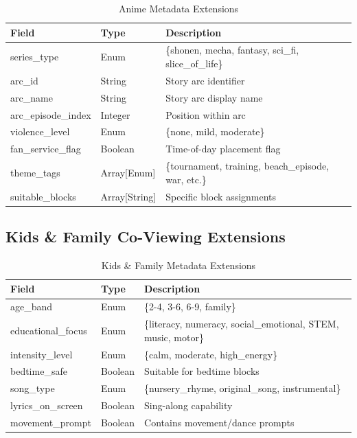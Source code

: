 \documentclass[12pt,letterpaper,twoside]{report}
\begin{document}
\begin{table}[H]
\centering
\caption{Anime Metadata Extensions}
\begin{tabular}{@{}L{4cm}L{3cm}L{6.5cm}@{}}
\toprule
\textbf{Field} & \textbf{Type} & \textbf{Description} \\
\midrule
series\_\allowbreak type & Enum & \{shonen, mecha, fantasy, sci\_\allowbreak fi, slice\_\allowbreak of\_\allowbreak life\} \\
arc\_\allowbreak id & String & Story arc identifier \\
arc\_\allowbreak name & String & Story arc display name \\
arc\_\allowbreak episode\_\allowbreak index & Integer & Position within arc \\
violence\_\allowbreak level & Enum & \{none, mild, moderate\} \\
fan\_\allowbreak service\_\allowbreak flag & Boolean & Time-of-day placement flag \\
theme\_\allowbreak tags & Array[Enum] & \{tournament, training, beach\_\allowbreak episode, war, etc.\} \\
suitable\_\allowbreak blocks & Array[String] & Specific block assignments \\
\bottomrule
\end{tabular}
\end{table}

\subsection{Kids \& Family Co-Viewing Extensions}

\begin{table}[H]
\centering
\caption{Kids \& Family Metadata Extensions}
\begin{tabular}{@{}L{4cm}L{3cm}L{6.5cm}@{}}
\toprule
\textbf{Field} & \textbf{Type} & \textbf{Description} \\
\midrule
age\_\allowbreak band & Enum & \{2-4, 3-6, 6-9, family\} \\
educational\_\allowbreak focus & Enum & \{literacy, numeracy, social\_\allowbreak emotional, STEM, music, motor\} \\
intensity\_\allowbreak level & Enum & \{calm, moderate, high\_\allowbreak energy\} \\
bedtime\_\allowbreak safe & Boolean & Suitable for bedtime blocks \\
song\_\allowbreak type & Enum & \{nursery\_\allowbreak rhyme, original\_\allowbreak song, instrumental\} \\
lyrics\_\allowbreak on\_\allowbreak screen & Boolean & Sing-along capability \\
movement\_\allowbreak prompt & Boolean & Contains movement/dance prompts \\
\bottomrule
\end{tabular}
\end{table}
\end{document}
